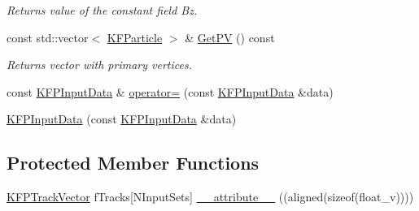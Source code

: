 \begin{DoxyCompactItemize}
\begin{DoxyCompactList}\small\item\em Returns value of the constant field Bz. \end{DoxyCompactList}\item 
const std\+::vector$<$ \hyperlink{classKFParticle}{K\+F\+Particle} $>$ \& \hyperlink{classKFPInputData_a3098293f0eb01bb7d171fe42563682ca}{Get\+PV} () const \hypertarget{classKFPInputData_a3098293f0eb01bb7d171fe42563682ca}{}\label{classKFPInputData_a3098293f0eb01bb7d171fe42563682ca}

\begin{DoxyCompactList}\small\item\em Returns vector with primary vertices. \end{DoxyCompactList}\item 
const \hyperlink{classKFPInputData}{K\+F\+P\+Input\+Data} \& \hyperlink{classKFPInputData_ad3c7a25365676e205e1bee863a1aec97}{operator=} (const \hyperlink{classKFPInputData}{K\+F\+P\+Input\+Data} \&data)
\item 
\hyperlink{classKFPInputData_aed2c6e7bbb5ad52829e6bdd7e793a744}{K\+F\+P\+Input\+Data} (const \hyperlink{classKFPInputData}{K\+F\+P\+Input\+Data} \&data)
\end{DoxyCompactItemize}
\subsection*{Protected Member Functions}
\begin{DoxyCompactItemize}
\item 
\hyperlink{classKFPTrackVector}{K\+F\+P\+Track\+Vector} f\+Tracks\mbox{[}N\+Input\+Sets\mbox{]} \hyperlink{classKFPInputData_a183681a0efc063cc7803b97f30034d8d}{\+\_\+\+\_\+attribute\+\_\+\+\_\+} ((aligned(sizeof(float\+\_\+v))))
\end{DoxyCompactItemize}
